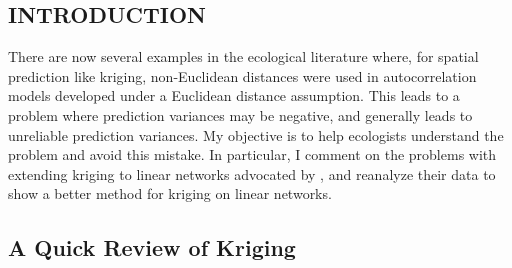 \documentclass[11pt, titlepage]{article}\usepackage[]{graphicx}\usepackage[]{color}
\begin{document}

\newpage
\begin{spacing}{1.9}
\begin{flushleft}
\setlength{\parindent}{1cm}



\section*{INTRODUCTION}

There are now several examples in the ecological literature where, for spatial prediction like kriging, non-Euclidean distances were used in autocorrelation models developed under a Euclidean distance assumption.  This leads to a problem where prediction variances may be negative, and generally leads to unreliable prediction variances.  My objective is to help ecologists understand the problem and avoid this mistake.  In particular, I comment on the problems with extending kriging to linear networks advocated by \citet{Ladl:Avga:Whea:Boyc:pred:2016}, and reanalyze their data to show a better method for kriging on linear networks.

\subsection*{A Quick Review of Kriging}


\end{flushleft}
\end{spacing}
\end{document}
